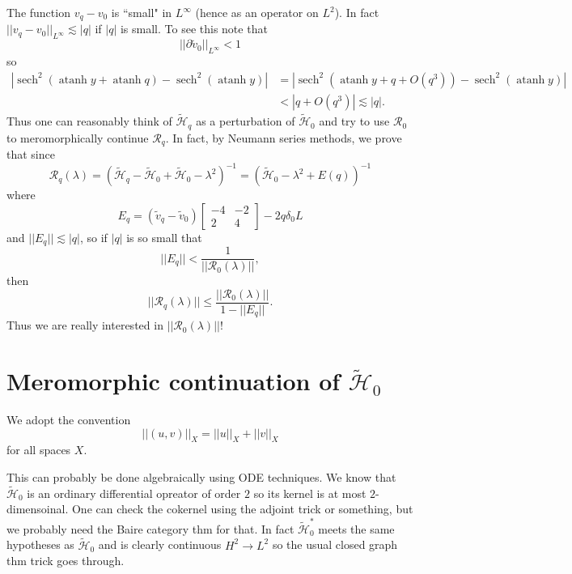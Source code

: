 \documentclass[12pt]{report}
\DeclareMathOperator{\atanh}{atanh}
\DeclareMathOperator{\sech}{sech}
\theoremstyle{definition}
\begin{document}
The function $v_q - v_0$ is ``small" in $L^\infty$ (hence as an operator on $L^2$). In fact $||v_q - v_0||_{L^\infty} \lesssim |q|$ if $|q|$ is small. To see this note that
$$||\partial \tilde v_0||_{L^\infty} < 1$$
so
\begin{align*}|\sech^2(\atanh y + \atanh q) - \sech^2(\atanh y)| &= |\sech^2(\atanh y + q + O(q^3)) - \sech^2(\atanh y)| \\&< |q + O(q^3)| \lesssim |q|.\end{align*}
Thus one can reasonably think of $\mathcal{\tilde H}_q$ as a perturbation of $\mathcal{\tilde H}_0$ and try to use $\mathcal R_0$ to meromorphically continue $\mathcal R_q$.
In fact, by Neumann series methods, we prove that since
$$\mathcal R_q(\lambda) = (\mathcal{\tilde H}_q - \mathcal{\tilde H}_0 + \mathcal{\tilde H}_0 - \lambda^2)^{-1} = (\mathcal{\tilde H}_0 - \lambda^2 + E(q))^{-1}$$
where
$$E_q = (\tilde v_q - \tilde v_0)\begin{bmatrix}-4 & -2\\2 & 4\end{bmatrix} - 2q\delta_0L$$
and $||E_q|| \lesssim |q|$, so if $|q|$ is so small that
$$||E_q|| < \frac{1}{||\mathcal R_0(\lambda)||},$$
then
$$||\mathcal R_q(\lambda)|| \leq \frac{||\mathcal R_0(\lambda)||}{1 - ||E_q||}.$$
Thus we are really interested in $||\mathcal R_0(\lambda)||$!

\section{Meromorphic continuation of $\mathcal{\tilde H}_0$}
We adopt the convention
$$||(u, v)||_X = ||u||_X + ||v||_X$$
for all spaces $X$.

This can probably be done algebraically using ODE techniques. We know that $\mathcal{\tilde H}_0$ is an ordinary differential opreator of order $2$ so its kernel is at most $2$-dimensoinal.
One can check the cokernel using the adjoint trick or something, but we probably need the Baire category thm for that.
In fact $\mathcal{\tilde H}_0^*$ meets the same hypotheses as $\mathcal{\tilde H}_0$ and is clearly continuous $H^2 \to L^2$ so the usual closed graph thm trick goes through.




\newpage
\printindex
\end{document}
